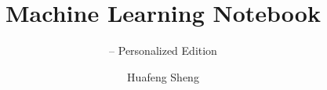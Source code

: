 \documentclass[norunningheads, graybox, envcountchap]{styles02/svmono}
\begin{document}
	
	\author{Huafeng Sheng}
	\title{Machine Learning Notebook}
	\subtitle{-- Personalized Edition}
	\maketitle
	
	\frontmatter%
	
	
	
	
	\tableofcontents
	
	
	
	\mainmatter%
	
	
	
	
	
	
	
	
	
	
	
	
	
	
	
	
	
	
	
	
	
	
	
	
	
	
	
	
	
	\backmatter%
	\appendix
	
	
	\printindex
	
	
\end{document}
